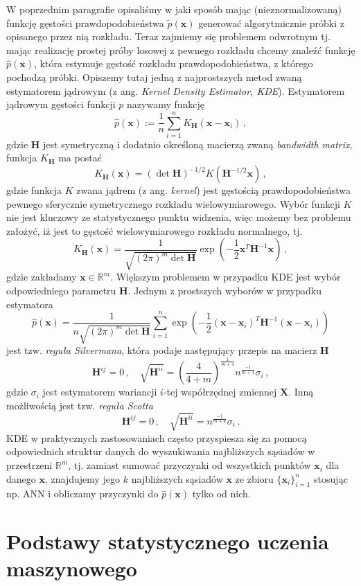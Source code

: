 \documentclass{myclass}
\numberwithin{equation}{subsection}
\begin{document}
W poprzednim paragrafie opisaliśmy w jaki sposób mając (nieznormalizowaną) funkcję gęstości
prawdopodobieństwa \(\tilde{p}(\bm{x})\) generować algorytmicznie próbki z opisanego przez nią
rozkładu. Teraz zajmiemy się problemem odwrotnym tj. mając realizację prostej próby losowej z
pewnego rozkładu chcemy znaleźć funkcję \(\hat{p}(\bm{x})\), która estymuje gęstość rozkładu
prawdopodobieństwa, z którego pochodzą próbki. Opiszemy tutaj jedną z najprostszych metod zwaną
estymatorem jądrowym (z ang. \textit{Kernel Density Estimator, KDE}). Estymatorem jądrowym gęstości
funkcji \(p\) nazywamy funkcję
\[
\hat{p}(\bm{x}) := \frac{1}{n}\sum_{i=1}^n K_{\bm{H}}(\bm{x} - \bm{x}_i)\,,
\]
gdzie \(\bm{H}\) jest symetryczną i dodatnio określoną macierzą zwaną \textit{bandwidth matrix},
funkcja \(K_{\bm{H}}\) ma postać
\[
K_{\bm{H}}(\bm{x}) = (\det \bm{H})^{-1/2} K(\bm{H}^{-1/2}\bm{x})\,,
\]
gdzie funkcja \(K\) zwana jądrem (z ang. \textit{kernel}) jest gęstością prawdopodobieństwa pewnego
sferycznie symetrycznego rozkładu wielowymiarowego. Wybór funkcji \(K\) nie jest kluczowy ze
statystycznego punktu widzenia, więc możemy bez problemu założyć, iż jest to gęstość
wielowymiarowego rozkładu normalnego, tj.
\[
K_{\bm{H}}(\bm{x}) = \frac{1}{\sqrt{(2\pi)^m \det\bm{H}}} \exp\left(-\frac{1}{2} \bm{x}^T\bm{H}^{-1}\bm{x}\right)\,,
\]
gdzie zakładamy \(\bm{x} \in \mathbb{R}^m\). Większym problemem w przypadku KDE jest wybór
odpowiedniego parametru \(\bm{H}\). Jednym z prostszych wyborów w przypadku estymatora
\[
\boxed{
\hat{p}(\bm{x}) = \frac{1}{n\sqrt{(2\pi)^m \det\bm{H}}} \sum_{i=1}^n \exp\left(-\frac{1}{2} (\bm{x} - \bm{x}_i)^T\bm{H}^{-1}(\bm{x} - \bm{x}_i)\right)
}
\]
jest tzw. \emph{reguła Silvermana}, która podaje następujący przepis na macierz \(\bm{H}\)
\[
\bm{H}^{ij} = 0\,,\quad \sqrt{\bm{H}^{ii}} = \left(\frac{4}{4 + m}\right)^\frac{1}{m + 4} n^\frac{-1}{m + 4} \sigma_i\,,
\] 
gdzie \(\sigma_i\) jest estymatorem wariancji \(i\)-tej współrzędnej zmiennej \(\bm{X}\). Inną
możliwością jest tzw. \emph{reguła Scotta}
\[
\bm{H}^{ij} = 0\,,\quad \sqrt{\bm{H}^{ii}} = n^\frac{-1}{m+4} \sigma_i\,.
\]
KDE w praktycznych zastosowaniach często przyspiesza się za pomocą odpowiednich struktur danych do
wyszukiwania najbliższych sąsiadów w przestrzeni \(\mathbb{R}^m\), tj. zamiast sumować przyczynki od
wszystkich punktów \(\bm{x}_i\) dla danego \(\bm{x}\), znajdujemy jego \(k\) najbliższych sąsiadów
\(\bm{x}\) ze zbioru \(\{\bm{x}_i\}_{i=1}^n\) stosując np. ANN i obliczamy przyczynki do
\(\hat{p}(\bm{x})\) tylko od nich.


\section{Podstawy statystycznego uczenia maszynowego}
\end{document}
